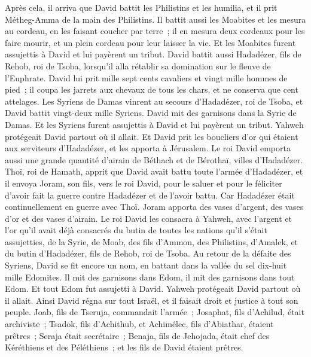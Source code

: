 \begin{multicols}{2}
\VerseOne{}Après cela, il arriva que David battit les Philistins et les humilia, et il prit Métheg-Amma de la main des Philistins.
Il battit aussi les Moabites et les mesura au cordeau, en les faisant coucher par terre~; il en mesura deux cordeaux pour les faire mourir, et un plein cordeau pour leur laisser la vie. Et les Moabites furent assujettis à David et lui payèrent un tribut.
David battit aussi Hadadézer, fils de Rehob, roi de Tsoba, lorsqu'il alla rétablir sa domination sur le fleuve de l'Euphrate.
David lui prit mille sept cents cavaliers et vingt mille hommes de pied~; il coupa les jarrets aux chevaux de tous les chars, et ne conserva que cent attelages.
Les Syriens de Damas vinrent au secours d'Hadadézer, roi de Tsoba, et David battit vingt-deux mille Syriens.
David mit des garnisons dans la Syrie de Damas. Et les Syriens furent assujettis à David et lui payèrent un tribut. Yahweh protégeait David partout où il allait.
Et David prit les boucliers d'or qui étaient aux serviteurs d'Hadadézer, et les apporta à Jérusalem.
Le roi David emporta aussi une grande quantité d'airain de Béthach et de Bérothaï, villes d'Hadadézer.
Thoï, roi de Hamath, apprit que David avait battu toute l'armée d'Hadadézer,
et il envoya Joram, son fils, vers le roi David, pour le saluer et pour le féliciter d'avoir fait la guerre contre Hadadézer et de l'avoir battu. Car Hadadézer était continuellement en guerre avec Thoï. Joram apporta des vases d'argent, des vases d'or et des vases d'airain.
Le roi David les consacra à Yahweh, avec l'argent et l'or qu'il avait déjà consacrés du butin de toutes les nations qu'il s'était assujetties,
de la Syrie, de Moab, des fils d'Ammon, des Philistins, d'Amalek, et du butin d'Hadadézer, fils de Rehob, roi de Tsoba.
Au retour de la défaite des Syriens, David se fit encore un nom, en battant dans la vallée du sel dix-huit mille Edomites.
Il mit des garnisons dans Edom, il mit des garnisons dans tout Edom. Et tout Edom fut assujetti à David. Yahweh protégeait David partout où il allait.
Ainsi David régna sur tout Israël, et il faisait droit et justice à tout son peuple.
Joab, fils de Tseruja, commandait l'armée~; Josaphat, fils d'Achilud, était archiviste~;
Tsadok, fils d'Achithub, et Achimélec, fils d'Abiathar, étaient prêtres~; Seraja était secrétaire~;
Benaja, fils de Jehojada, était chef des Kéréthiens et des Péléthiens~; et les fils de David étaient prêtres.

\end{multicols}
